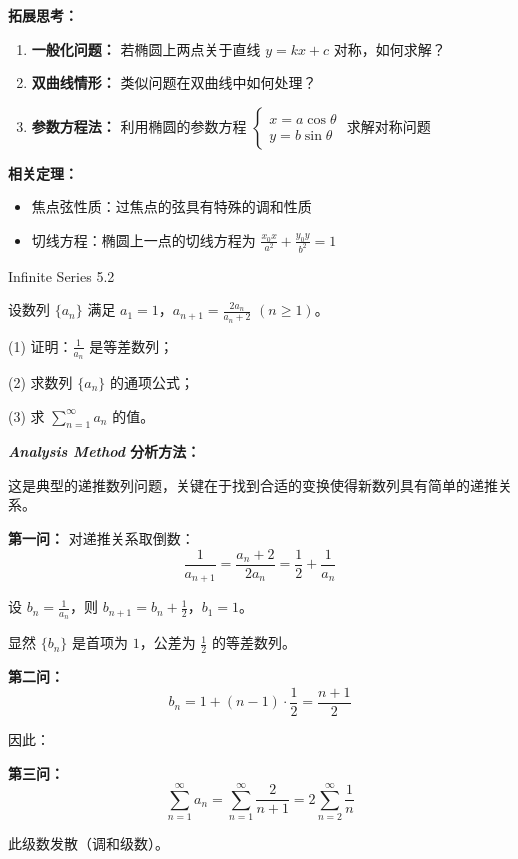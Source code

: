 \documentclass{ctexart}
\begin{document}
\begin{expandbox}
\textbf{拓展思考：}

\begin{enumerate}[leftmargin=15pt, itemsep=8pt]
    \item \textbf{一般化问题：} 若椭圆上两点关于直线 $y = kx + c$ 对称，如何求解？
    
    \item \textbf{双曲线情形：} 类似问题在双曲线中如何处理？
    
    \item \textbf{参数方程法：} 利用椭圆的参数方程 $\begin{cases} x = a\cos\theta \\ y = b\sin\theta \end{cases}$ 求解对称问题
\end{enumerate}

\textbf{相关定理：}
\begin{itemize}[leftmargin=15pt, itemsep=5pt]
    \item 焦点弦性质：过焦点的弦具有特殊的调和性质
    \item 切线方程：椭圆上一点的切线方程为 $\frac{x_0 x}{a^2} + \frac{y_0 y}{b^2} = 1$
\end{itemize}
\end{expandbox}

\newpage

\begin{center}
    \begin{chaptertitle}{\faInfinity}{Infinite Series 5.2}
    \end{chaptertitle}
\end{center}

\begin{summarybox}{5.1}
设数列 $\{a_n\}$ 满足 $a_1 = 1$，$a_{n+1} = \frac{2a_n}{a_n + 2}$ $(n \geq 1)$。

(1) 证明：$\frac{1}{a_n}$ 是等差数列；

(2) 求数列 $\{a_n\}$ 的通项公式；

(3) 求 $\sum_{n=1}^{\infty} a_n$ 的值。
\end{summarybox}

\begin{formulabox}
\textbf{\color{elegantpurple}\textit{Analysis Method} \quad 分析方法：}

这是典型的递推数列问题，关键在于找到合适的变换使得新数列具有简单的递推关系。

\textbf{第一问：} 对递推关系取倒数：
$$\frac{1}{a_{n+1}} = \frac{a_n + 2}{2a_n} = \frac{1}{2} + \frac{1}{a_n}$$

设 $b_n = \frac{1}{a_n}$，则 $b_{n+1} = b_n + \frac{1}{2}$，$b_1 = 1$。

显然 $\{b_n\}$ 是首项为 $1$，公差为 $\frac{1}{2}$ 的等差数列。

\textbf{第二问：} 
$$b_n = 1 + (n-1) \cdot \frac{1}{2} = \frac{n+1}{2}$$

因此：

\textbf{第三问：} 
$$\sum_{n=1}^{\infty} a_n = \sum_{n=1}^{\infty} \frac{2}{n+1} = 2\sum_{n=2}^{\infty} \frac{1}{n}$$

此级数发散（调和级数）。
\end{formulabox}
\end{document}

